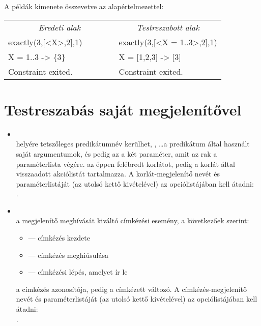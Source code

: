 A példák kimenete összevetve az alapértelmezettel:

\begin{center}\tt\begin{tabular}{l|l}
\multicolumn{1}{c}{\rm \em Eredeti alak} &
\multicolumn{1}{c}{\rm \em Testreszabott alak} \\

exactly(3,[<X>,2],1)~~~~~~~ & exactly(3,[<X = 1..3>,2],1) \\
    X = 1..3 -> \{3\}       &     X = [1,2,3] -> [3]      \\
    Constraint exited.      &     Constraint exited. \\
\end{tabular}\end{center}

\section{Testreszabás saját megjelenítővel}

\begin{itemize}
\item {}\\
 helyére tetszőleges predikátumnév kerülhet, ,
 \ldots a predikátum által használt saját argumentumok, 
és  pedig az a két paraméter, amit az  rak a paraméterlista
végére.  az éppen felébredt korlátot,  pedig a korlát
által visszaadott akciólistát tartalmazza. A korlát-megjelenítő nevét és paraméterlistáját
(az utolsó kettő kivételével) az  opciólistájában kell átadni:\\
.

\item {}\\
 a megjelenítő meghívását kiváltó címkézési esemény, a következőek szerint:
\begin{itemize}
\item {} --- címkézés kezdete
\item {} --- címkézés meghiúsulása
\item {} --- címkézési lépés, amelyet  ír le
\end{itemize}
 a címkézés azonosítója,  pedig a címkézett változó. A
címkézés-megjelenítő nevét és paraméterlistáját (az utolsó kettő kivételével) az
 opciólistájában kell átadni:\\
.
\end{itemize}

